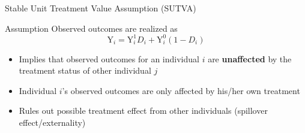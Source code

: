 \documentclass[hyperref={pdfpagelabels=false}]{beamer}
\begin{document}





\date
{}


\begin{frame}{}
	\titlepage
\end{frame}







\begin{frame}{Stable Unit Treatment Value Assumption (SUTVA)}
	\begin{block}{Assumption}
		Observed outcomes are realized as 
		\begin{equation*}
		\mathrm{Y}_i=\mathrm{Y}^{1}_{i}D_i+\mathrm{Y}^{0}_{i}(1-D_i)
		\end{equation*}
	\end{block}
	\begin{itemize} 
		\item Implies that observed outcomes for an individual $i$ are \textbf{unaffected} by the treatment status of other individual $j$
		\vspace{0.2cm}
		
		\item Individual $i$'s observed outcomes are only affected by his/her own treatment 
		\vspace{0.2cm}
		\item Rules out possible treatment effect from other individuals (spillover effect/externality)
		
	\end{itemize}
\end{frame}
\end{document}
